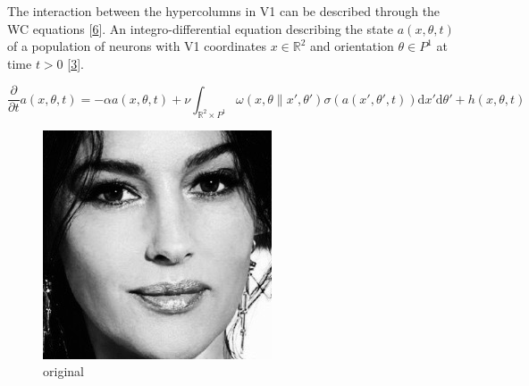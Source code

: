 \documentclass[american,]{article}
\theoremstyle{definition}
\theoremstyle{definition}
\theoremstyle{definition}
\theoremstyle{remark}
\begin{document}
The interaction between the hypercolumns in V1 can be described through
the WC equations {[}\protect\hyperlink{ref-bressloff2002}{6}{]}.
An integro-differential equation describing the state \(a(x,\theta,t)\) of a population
of neurons with V1 coordinates \(x\in\mathbb{R}^2\) and orientation \(\theta\in P^1\) at time \(t>0\) {[}\protect\hyperlink{ref-bertalmio2018}{3}{]}.

\begin{equation}
\frac{\partial}{\partial t}a(x,\theta,t) = -\alpha a(x,\theta,t) + \nu
\int_{\mathbb{R}^2\times P^1} \omega(x,\theta\| x',\theta') \sigma(a(x',\theta',t)) \mathrm{d}x'\mathrm{d}\theta'
+ h(x,\theta,t)
\end{equation}

\begin{figure}[H]
    \centering
    \begin{minipage}{0.3\linewidth}
        \centering
        \includegraphics[width=\textwidth]{img/img_original.jpg}\\original
    \end{minipage}\hfill%
    \begin{minipage}{0.3\linewidth}
        \centering

\end{minipage}
\end{figure}
\end{document}
